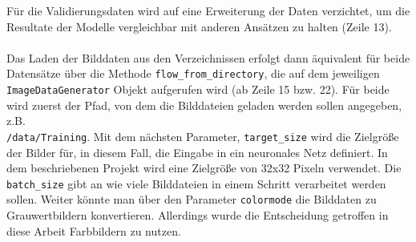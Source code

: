 Für die Validierungsdaten wird auf eine Erweiterung der Daten verzichtet, um die Resultate der Modelle vergleichbar mit anderen Ansätzen zu halten (Zeile 13).\\
\\
Das Laden der Bilddaten aus den Verzeichnissen erfolgt dann äquivalent für beide Datensätze über die Methode \texttt{flow\_from\_directory}, die auf dem jeweiligen\\
\texttt{ImageDataGenerator} Objekt aufgerufen wird (ab Zeile 15 bzw. 22). Für beide wird zuerst der Pfad, von dem die Bilddateien geladen werden sollen angegeben, z.B. \\
\texttt{/data/Training}. Mit dem nächsten Parameter, \texttt{target\_size} wird die Zielgröße der Bilder für, in diesem Fall, die Eingabe in ein neuronales Netz definiert. In dem beschriebenen Projekt wird eine Zielgröße von 32x32 Pixeln verwendet. Die \texttt{batch\_size} gibt an wie viele Bilddateien in einem Schritt verarbeitet werden sollen. Weiter könnte man über den Parameter \texttt{colormode} die Bilddaten zu Grauwertbildern konvertieren. Allerdings wurde die Entscheidung getroffen in diese Arbeit Farbbildern zu nutzen.

